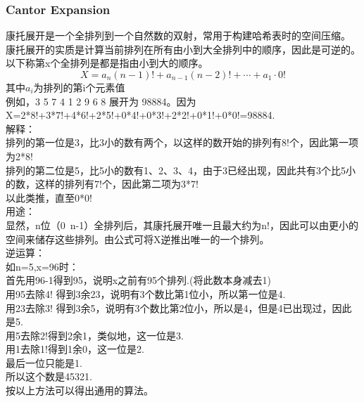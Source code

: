 \documentclass[10pt]{ctexart}
\begin{document}
{{\subsubsection{Cantor Expansion}
康托展开是一个全排列到一个自然数的双射，常用于构建哈希表时的空间压缩。 康托展开的实质是计算当前排列在所有由小到大全排列中的顺序，因此是可逆的。
以下称第x个全排列是都是指由小到大的顺序。\\
$$
X = a_n(n-1)! + a_{n-1}(n-2)! + \cdots + a_1\cdot 0!
$$
其中$a_i$为排列的第i个元素值\\
例如，3 5 7 4 1 2 9 6 8 展开为 98884。因为X=2*8!+3*7!+4*6!+2*5!+0*4!+0*3!+2*2!+0*1!+0*0!=98884.\\
解释：\\
排列的第一位是3，比3小的数有两个，以这样的数开始的排列有8!个，因此第一项为2*8!\\
排列的第二位是5，比5小的数有1、2、3、4，由于3已经出现，因此共有3个比5小的数，这样的排列有7!个，因此第二项为3*7!\\
以此类推，直至0*0!\\
用途：\\
显然，n位（0~n-1）全排列后，其康托展开唯一且最大约为n!，因此可以由更小的空间来储存这些排列。由公式可将X逆推出唯一的一个排列。\\
逆运算：\\
如n=5,x=96时：\\
首先用96-1得到95，说明x之前有95个排列.(将此数本身减去1)\\
用95去除4! 得到3余23，说明有3个数比第1位小，所以第一位是4.\\
用23去除3! 得到3余5，说明有3个数比第2位小，所以是4，但是4已出现过，因此是5.\\
用5去除2!得到2余1，类似地，这一位是3.\\
用1去除1!得到1余0，这一位是2.\\
最后一位只能是1.\\
所以这个数是45321.\\
按以上方法可以得出通用的算法。\\
}}
\end{document}
